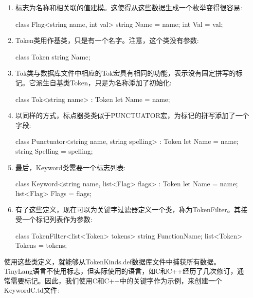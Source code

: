 \begin{enumerate}
\item
标志为名称和相关联的值建模。这使得从这些数据生成一个枚举变得很容易:

\begin{shell}
class Flag<string name, int val> {
    string Name = name;
    int Val = val;
}
\end{shell}

\item
Token类用作基类，只是有一个名字。注意，这个类没有参数:

\begin{shell}
class Token {
    string Name;
}
\end{shell}

\item
Tok类与数据库文件中相应的Tok宏具有相同的功能，表示没有固定拼写的标记。它派生自基类Token，只是为名称添加了初始化:

\begin{shell}
class Tok<string name> : Token {
    let Name = name;
}
\end{shell}

\item
以同样的方式，标点器类类似于PUNCTUATOR宏，为标记的拼写添加了一个字段:

\begin{shell}
class Punctuator<string name, string spelling> : Token {
    let Name = name;
    string Spelling = spelling;
}
\end{shell}

\item
最后，Keyword类需要一个标志列表:

\begin{shell}
class Keyword<string name, list<Flag> flags> : Token {
    let Name = name;
    list<Flag> Flags = flags;
}
\end{shell}

\item
有了这些定义，现在可以为关键字过滤器定义一个类，称为TokenFilter。其接受一个标记列表作为参数:

\begin{shell}
class TokenFilter<list<Token> tokens> {
    string FunctionName;
    list<Token> Tokens = tokens;
}
\end{shell}
\end{enumerate}

使用这些类定义，就能够从TokenKinds.def数据库文件中捕获所有数据。TinyLang语言不使用标志，但实际使用的语言，如C和C++经历了几次修订，通常需要标记。因此，我们使用C和C++中的关键字作为示例，来创建一个KeywordC.td文件:

